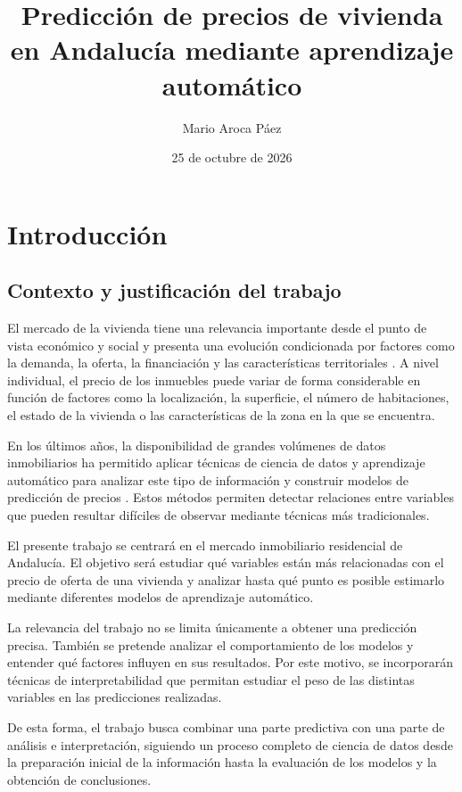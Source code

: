 \documentclass[IB]{TFUOC}%
\title{Predicción de precios de vivienda en Andalucía mediante aprendizaje automático}
\author{Mario Aroca Páez}
\date{25 de octubre de 2026}
\begin{document}
\estructura

\tableofcontents






\chapter{Introducción}

\section{Contexto y justificación del trabajo}

El mercado de la vivienda tiene una relevancia importante desde el punto de vista económico y social y presenta una evolución condicionada por factores como la demanda, la oferta, la financiación y las características territoriales \cite{bde_vivienda2024}. A nivel individual, el precio de los inmuebles puede variar de forma considerable en función de factores como la localización, la superficie, el número de habitaciones, el estado de la vivienda o las características de la zona en la que se encuentra.

En los últimos años, la disponibilidad de grandes volúmenes de datos inmobiliarios ha permitido aplicar técnicas de ciencia de datos y aprendizaje automático para analizar este tipo de información y construir modelos de predicción de precios \cite{houseprice_survey2023}. Estos métodos permiten detectar relaciones entre variables que pueden resultar difíciles de observar mediante técnicas más tradicionales.

El presente trabajo se centrará en el mercado inmobiliario residencial de Andalucía. El objetivo será estudiar qué variables están más relacionadas con el precio de oferta de una vivienda y analizar hasta qué punto es posible estimarlo mediante diferentes modelos de aprendizaje automático.

La relevancia del trabajo no se limita únicamente a obtener una predicción precisa. También se pretende analizar el comportamiento de los modelos y entender qué factores influyen en sus resultados. Por este motivo, se incorporarán técnicas de interpretabilidad que permitan estudiar el peso de las distintas variables en las predicciones realizadas.

De esta forma, el trabajo busca combinar una parte predictiva con una parte de análisis e interpretación, siguiendo un proceso completo de ciencia de datos desde la preparación inicial de la información hasta la evaluación de los modelos y la obtención de conclusiones.
\end{document}
